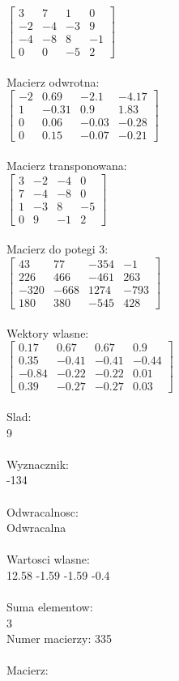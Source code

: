 \documentclass[a4paper,12pt]{article}
\begin{document}
$\begin{bmatrix} 3&7&1&0\\-2&-4&-3&9\\-4&-8&8&-1\\0&0&-5&2 \end{bmatrix}$
\\
\\
Macierz odwrotna:\\

$\begin{bmatrix} -2&0.69&-2.1&-4.17\\1&-0.31&0.9&1.83\\0&0.06&-0.03&-0.28\\0&0.15&-0.07&-0.21 \end{bmatrix}$
\\
\\
Macierz transponowana:\\

$\begin{bmatrix} 3&-2&-4&0\\7&-4&-8&0\\1&-3&8&-5\\0&9&-1&2 \end{bmatrix}$
\\
\\
Macierz do potegi 3:\\

$\begin{bmatrix} 43&77&-354&-1\\226&466&-461&263\\-320&-668&1274&-793\\180&380&-545&428 \end{bmatrix}$
\\
\\
Wektory wlasne:\\

$\begin{bmatrix} 0.17&0.67&0.67&0.9\\0.35&-0.41&-0.41&-0.44\\-0.84&-0.22&-0.22&0.01\\0.39&-0.27&-0.27&0.03 \end{bmatrix}$
\\
\\
Slad:\\
9
\\
\\
Wyznacznik:\\
-134
\\
\\
Odwracalnosc:\\
Odwracalna
\\
\\
Wartosci wlasne:\\
12.58 -1.59 -1.59 -0.4
\\
\\
Suma elementow:\\
3
\\
\newpage
Numer macierzy:
335
\\
\\
Macierz:\\
\end{document}
